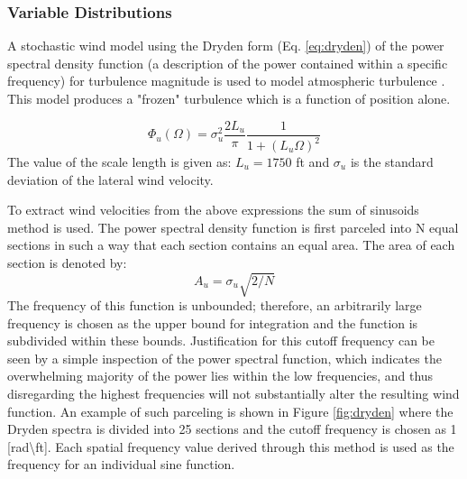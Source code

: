 \documentclass[10pt,a4paper]{article}
\begin{document}
\subsubsection{Variable Distributions}

A stochastic wind model using the Dryden form (Eq. \ref{eq:dryden}) of the power spectral density function (a description of the power contained within a specific frequency) for turbulence magnitude is used to model atmospheric turbulence \cite{dryden}. This model produces a "frozen" turbulence which is a function of position alone.


\begin{equation}
\Phi_u (\Omega) = \sigma_u^2 \frac{2L_u}{\pi}\frac{1}{1+(L_u\Omega)^2}
\label{eq:dryden}
\end{equation}
The value of the scale length is given as: $L_u = 1750$ ft and $\sigma_u$ is the standard deviation of the lateral wind velocity.

To extract wind velocities from the above expressions the sum of sinusoids method is used. The power spectral density function is first parceled into N equal sections in such a way that each section contains an equal area. The area of each section is denoted by:
\begin{equation}
A_u =\sigma_u\sqrt{2/N}
\end{equation}
The frequency of this function is unbounded; therefore, an arbitrarily large frequency is chosen as the upper bound for integration and the function is subdivided within these bounds. Justification for this cutoff frequency can be seen by a simple inspection of the power spectral function, which indicates the overwhelming majority of the power lies within the low frequencies, and thus disregarding the highest frequencies will not substantially alter the resulting wind function. An example of such parceling is shown in Figure \ref{fig:dryden} where the Dryden spectra is divided into 25 sections and the cutoff frequency is chosen as 1 [rad\textbackslash ft]. Each spatial frequency value derived through this method is used as the frequency for an individual sine function.
\end{document}
